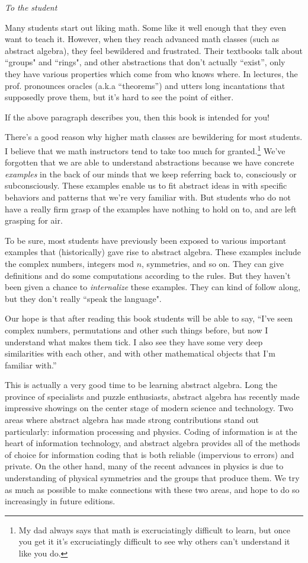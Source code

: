 
\emph{To the student}
\medskip

Many students start out liking math. Some like it well enough that they even want to teach it. However, when they reach advanced math classes (such as abstract algebra), they feel bewildered and frustrated. Their textbooks talk about ``groups" and ``rings",  and other abstractions that don't actually ``exist'', only they have various properties which come from who knows where. In lectures, the prof. pronounces oracles (a.k.a “theorems”) and utters long incantations that supposedly prove them, but it's hard to see the point of either. 
\smallskip

If the above paragraph describes you, then this book is intended for you!

There's a good reason why higher math classes are bewildering for most students. I believe that we math instructors tend to take too much for granted.\footnote{My dad always says that math is excruciatingly difficult to learn, but once you get  it it's excruciatingly difficult to see why others can't understand it like you do.} We've forgotten that we are able to understand abstractions because we have concrete \emph{examples} in the back of our minds that we keep referring back to, consciously or subconsciously. These examples enable us to fit abstract ideas in with specific behaviors and patterns that we're very familiar with. But students who do not have a really firm grasp of the examples have nothing to hold on to, and are left grasping for air. 

To be sure, most students have previously been exposed to various important examples that (historically) gave rise to abstract algebra. These examples include the complex numbers, integers mod $n$, symmetries, and so on. They can give definitions and do some computations according to the rules. But they haven't been given a chance to \emph{internalize} these examples.  They can kind of follow along, but they don't really ``speak the language".

Our hope is that after reading this book students will be able to say, ``I've seen complex numbers, permutations and other such things before, but now I understand what makes them tick. I also see they have some very deep similarities with each other, and with other mathematical objects that I'm familiar with.'' 

This is actually a very good time to be learning abstract algebra. Long the province of specialists and puzzle enthusiasts, abstract algebra has recently made  impressive showings on the center stage of modern  science and technology. Two areas where abstract algebra has made strong contributions stand out particularly: information processing and physics. Coding of information is at the heart of information technology, and abstract algebra provides all of the methods of choice for information coding that is both reliable (impervious to errors) and private.  
On the other hand,  many of the recent advances in  physics is due to understanding of physical symmetries and the groups that produce them. We try as much as possible to make connections with these two areas, and hope to do so increasingly in future editions. 

